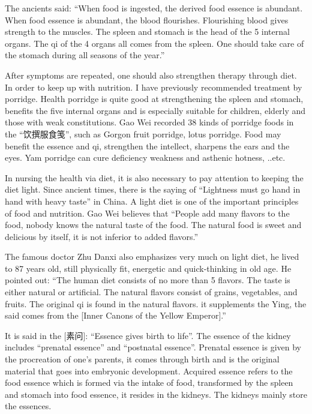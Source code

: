 \documentclass[
]{book}
\begin{document}
The ancients said: ``When food is ingested, the derived food essence is abundant. When food essence is abundant, the blood flourishes. Flourishing blood gives strength to the muscles. The spleen and stomach is the head of the 5 internal organs. The qi of the 4 organs all comes from the spleen. One should take care of the stomach during all seasons of the year.''

After symptoms are repeated, one should also strengthen therapy through diet. In order to keep up with nutrition. I have previously recommended treatment by porridge. Health porridge is quite good at strengthening the spleen and stomach, benefits the five internal organs and is especially suitable for children, elderly and those with weak constitutions. Gao Wei recorded 38 kinds of porridge foods in the ``饮撰服食笺'', such as Gorgon fruit porridge, lotus porridge. Food may benefit the essence and qi, strengthen the intellect, sharpens the ears and the eyes. Yam porridge can cure deficiency weakness and asthenic hotness, ..etc.

In nursing the health via diet, it is also necessary to pay attention to keeping the diet light. Since ancient times, there is the saying of ``Lightness must go hand in hand with heavy taste'' in China. A light diet is one of the important principles of food and nutrition. Gao Wei believes that ``People add many flavors to the food, nobody knows the natural taste of the food. The natural food is sweet and delicious by itself, it is not inferior to added flavors.''

The famous doctor Zhu Danxi also emphasizes very much on light diet, he lived to 87 years old, still physically fit, energetic and quick-thinking in old age. He pointed out: ``The human diet consists of no more than 5 flavors. The taste is either natural or artificial. The natural flavors consist of grains, vegetables, and fruits. The original qi is found in the natural flavors. it supplements the Ying, the said comes from the {[}Inner Canons of the Yellow Emperor{]}.''

It is said in the {[}素问{]}: ``Essence gives birth to life''. The essence of the kidney includes ``prenatal essence'' and ``postnatal essence''. Prenatal essence is given by the procreation of one's parents, it comes through birth and is the original material that goes into embryonic development. Acquired essence refers to the food essence which is formed via the intake of food, transformed by the spleen and stomach into food essence, it resides in the kidneys. The kidneys mainly store the essences.
\end{document}
